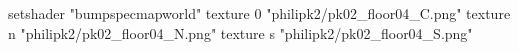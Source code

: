 setshader "bumpspecmapworld"
    texture 0 "philipk2/pk02_floor04_C.png"
    texture n "philipk2/pk02_floor04_N.png"
    texture s "philipk2/pk02_floor04_S.png"